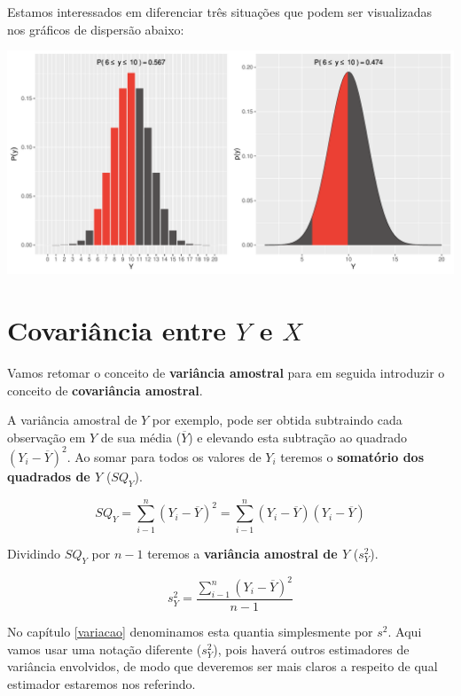 \documentclass[
]{book}
\begin{document}
Estamos interessados em diferenciar três situações que podem ser visualizadas nos gráficos de dispersão abaixo:

\begin{center}\includegraphics{probest-cambientais_files/figure-latex/unnamed-chunk-203-1} \end{center}

\hypertarget{covariuxe2ncia-entre-y-e-x}{%
\section{\texorpdfstring{Covariância entre \(Y\) e \(X\)}{Covariância entre Y e X}}\label{covariuxe2ncia-entre-y-e-x}}

Vamos retomar o conceito de \textbf{variância amostral} para em seguida introduzir o conceito de \textbf{covariância amostral}.

A variância amostral de \(Y\) por exemplo, pode ser obtida subtraindo cada observação em \(Y\) de sua média (\(\overline{Y}\)) e elevando esta subtração ao quadrado \((Y_i - \overline{Y})^2\). Ao somar para todos os valores de \(Y_i\) teremos o \textbf{somatório dos quadrados de \(Y\)} (\(SQ_Y\)).

\[SQ_Y = \sum_{i-1}^{n} (Y_i - \overline{Y})^2 = \sum_{i-1}^{n}(Y_i - \overline{Y}) (Y_i - \overline{Y})\]

Dividindo \(SQ_Y\) por \(n-1\) teremos a \textbf{variância amostral de \(Y\)} (\(s^2_Y\)).

\[s^2_Y = \frac{\sum_{i-1}^{n} (Y_i - \overline{Y})^2}{n-1}\]

No capítulo \ref{variacao} denominamos esta quantia simplesmente por \(s^2\). Aqui vamos usar uma notação diferente (\(s^2_Y\)), pois haverá outros estimadores de variância envolvidos, de modo que deveremos ser mais claros a respeito de qual estimador estaremos nos referindo.
\end{document}
